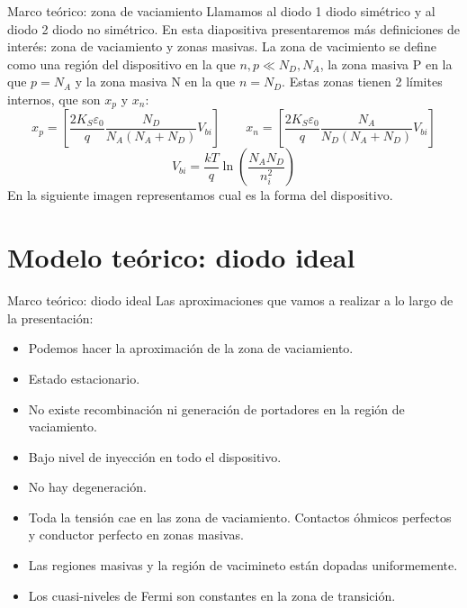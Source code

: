 \documentclass[aspectratio=169,xcolor=dvipsnames]{beamer}
\newcommand{\parentesis}[1]{\left( #1  \right)}
\newcommand{\ccorchetes}[1]{\left[ #1  \right]}
\begin{document}
\begin{frame}{Marco teórico: zona de vaciamiento}
    Llamamos al diodo 1 diodo simétrico y al diodo 2 diodo no simétrico. En esta diapositiva presentaremos más definiciones de interés: zona de vaciamiento y zonas masivas. La zona de vacimiento se define como una región del dispositivo en la que $n,p\ll N_D,N_A$, la zona masiva P en la que $p=N_A$ y la zona masiva N en la que $n=N_D$. Estas zonas tienen 2 límites internos, que son $x_p$ y $x_n$:
    \begin{equation*}
        x_p = \ccorchetes{\frac{2K_S\varepsilon_0}{q} \frac{N_D}{N_A(N_A+N_D)}  V_{bi}}   \qquad 
        x_n = \ccorchetes{\frac{2K_S\varepsilon_0}{q} \frac{N_A}{N_D(N_A+N_D)}  V_{bi}}
    \end{equation*}
    \begin{equation*}
        V_{bi} = \frac{kT}{q} \ln \parentesis{\frac{N_AN_D}{n_i^2}} 
    \end{equation*}
    En la siguiente imagen representamos cual es la forma del dispositivo.
\end{frame}

\section{Modelo teórico: diodo ideal}

\begin{frame}{Marco teórico: diodo ideal}
    Las aproximaciones que vamos a realizar a lo largo de la presentación: 
    \begin{itemize}
        \item Podemos hacer la aproximación de la zona de vaciamiento.
        \item Estado estacionario. 
        \item No existe recombinación ni generación de portadores en la región de vaciamiento. 
        \item Bajo nivel de inyección en todo el dispositivo. 
        \item No hay degeneración. 
        \item Toda la tensión cae en las zona de vaciamiento. Contactos óhmicos perfectos y conductor perfecto en zonas masivas. 
        \item Las regiones masivas y la región de vacimineto están dopadas uniformemente.
        \item Los cuasi-niveles de Fermi son constantes en la zona de transición. 
    \end{itemize}
\end{frame}
\end{document}
